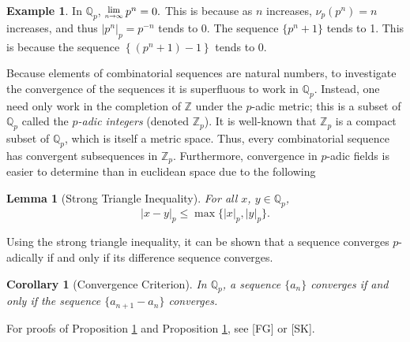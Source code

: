\documentclass[a0]{a0poster}
\newtheorem{corollary}{Corollary}
\newtheorem{lemma}{Lemma}
\theoremstyle{definition}
\newtheorem{example}{Example}
\newtheorem{definition}{Definition}
\newcommand{\Lim}[1]{\raisebox{0.5ex}{\scalebox{0.8}{$\displaystyle \lim_{#1}\;$}}}
\newcommand{\integers}{\mathbb{Z}}
\newcommand{\Q}{\mathbb{Q}}
\newcommand{\propref}[1]{Proposition \ref{#1}}
\newcommand{\fcite}[1]{[#1]}
\newcommand{\thlabel}[1]{\label{#1}}
\begin{document}
\begin{textblock}{7}

\begin{example} In $\mathbb{Q}_p$, $\Lim{n\rightarrow\infty}p^n=0.$ This is because as $n$ increases, $\nu_p(p^n)=n$ increases, and thus $|p^n|_p=p^{-n}$ tends to 0.
The sequence $\{p^n+1\}$ tends to 1. This is because the sequence $\left\{ (p^n+1)-1 \right\}$ tends to $0$.
\end{example}


\noindent Because elements of combinatorial sequences are natural numbers, to investigate the convergence of the sequences it is superfluous to work in $\Q_p$. Instead, one need only work in the completion of $\integers$ under the $p$-adic metric; this is a subset of $\Q_p$ called the \textit{$p$-adic integers} (denoted $\mathbb{Z}_p$). It is well-known that $\integers_p$ is a compact subset of $\Q_p$, which is itself a metric space. Thus, every combinatorial sequence has convergent subsequences in $\integers_p$. Furthermore, convergence in $p$-adic fields is easier to determine than in euclidean space due to the following 


\begin{lemma}[Strong Triangle Inequality]\thlabel{triangle}
For all $x$, $y\in\Q_p$, 
$$|x-y|_p\leq\max\{|x|_p,|y|_p\}.$$
\end{lemma}

\noindent Using the strong triangle inequality, it can be shown that a sequence converges $p$-adically if and only if its difference sequence converges.

\begin{corollary}[Convergence Criterion]
\thlabel{conv crit}
In $\Q_p$, a sequence $\{a_n\}$ converges if and only if the sequence $\{a_{n+1}-a_n\}$ converges.
\end{corollary}

\noindent For proofs of \propref{triangle} and \propref{conv crit}, see \fcite{FG} or \fcite{SK}. 


\end{textblock}
\end{document}
